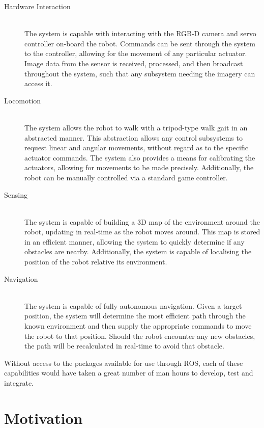 \begin{description}
	\item[Hardware Interaction] \hfill \\
	The system is capable with interacting with the RGB-D camera and servo controller on-board the robot. Commands can be sent through the system to the controller, allowing for the movement of any particular actuator. Image data from the sensor is received, processed, and then broadcast throughout the system, such that any subsystem needing the imagery can access it.

	\item[Locomotion] \hfill \\
	The system allows the robot to walk with a tripod-type walk gait in an abstracted manner. This abstraction allows any control subsystems to request linear and angular movements, without regard as to the specific actuator commands. The system also provides a means for calibrating the actuators, allowing for movements to be made precisely. Additionally, the robot can be manually controlled via a standard game controller.

	\item[Sensing] \hfill \\
	The system is capable of building a 3D map of the environment around the robot, updating in real-time as the robot moves around. This map is stored in an efficient manner, allowing the system to quickly determine if any obstacles are nearby. Additionally, the system is capable of localising the position of the robot relative its environment.

	\item[Navigation] \hfill \\
	The system is capable of fully autonomous navigation. Given a target position, the system will determine the most efficient path through the known environment and then supply the appropriate commands to move the robot to that position. Should the robot encounter any new obstacles, the path will be recalculated in real-time to avoid that obstacle.

\end{description}

Without access to the packages available for use through ROS, each of these capabilities would have taken a great number of man hours to develop, test and integrate. 

\section{Motivation}

